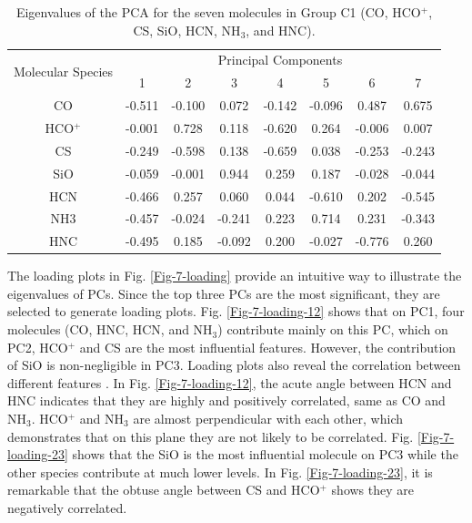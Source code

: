 \documentclass{aa}
\begin{document}
\begin{CJK*}{UTF8}{gbsn}
\begin{table}[htbp]
\centering
\begin{tabular}{cccccccc}
\hline\hline
\multirow{2}{*}{Molecular Species} & \multicolumn{7}{c}{Principal Components}                 \\ \cline{2-8} 
                                   & 1       & 2       & 3       & 4       & 5      & 6    & 7\\ \hline
CO                                  & -0.511 & -0.100 & 0.072  & -0.142 & -0.096 & 0.487  & 0.675  \\ \hline
HCO$^+$                               & -0.001 & 0.728  & 0.118  & -0.620 & 0.264  & -0.006 & 0.007  \\ \hline
CS                                 & -0.249 & -0.598 & 0.138  & -0.659 & 0.038   & -0.253 & -0.243 \\ \hline
SiO                                & -0.059 & -0.001 & 0.944   & 0.259  & 0.187  & -0.028 & -0.044 \\ \hline
HCN                                & -0.466 & 0.257  & 0.060    & 0.044  & -0.610 & 0.202   & -0.545 \\ \hline
NH3                                & -0.457 & -0.024 & -0.241 & 0.223  & 0.714  & 0.231  & -0.343 \\ \hline
HNC                                & -0.495 & 0.185  & -0.092 & 0.200  & -0.027 & -0.776 & 0.260 \\ \hline\hline
\end{tabular}
\caption{Eigenvalues of the PCA for the seven molecules in Group C1 (CO, HCO$^+$, CS, SiO, HCN, NH$_3$, and HNC).}
\label{table-7-eigenvalue}
\end{table}
   
   The loading plots in Fig. \ref{Fig-7-loading} provide an intuitive way to illustrate the eigenvalues of PCs. 
   Since the top three PCs are the most significant, they are selected to generate loading plots. 
   Fig. \ref{Fig-7-loading-12} shows that on PC1, four molecules (CO, HNC, HCN, and NH$_3$) contribute mainly on this PC, which on PC2, HCO$^+$ and CS are the most influential features.
   However, the contribution of SiO is non-negligible in PC3. 
   Loading plots also reveal the correlation between different features \citep{al2015principal}.
   In Fig. \ref{Fig-7-loading-12}, the acute angle between HCN and HNC indicates that they are highly and positively correlated, same as CO and NH$_3$. 
   HCO$^+$ and NH$_3$ are almost perpendicular with each other, which demonstrates that on this plane they are not likely to be correlated. Fig. \ref{Fig-7-loading-23} shows that the SiO is the most influential molecule on PC3 while the other species contribute at much lower levels. 
   In Fig. \ref{Fig-7-loading-23}, it is remarkable that the obtuse angle between CS and HCO$^+$ shows they are negatively correlated.
   

\end{CJK*}
\end{document}
